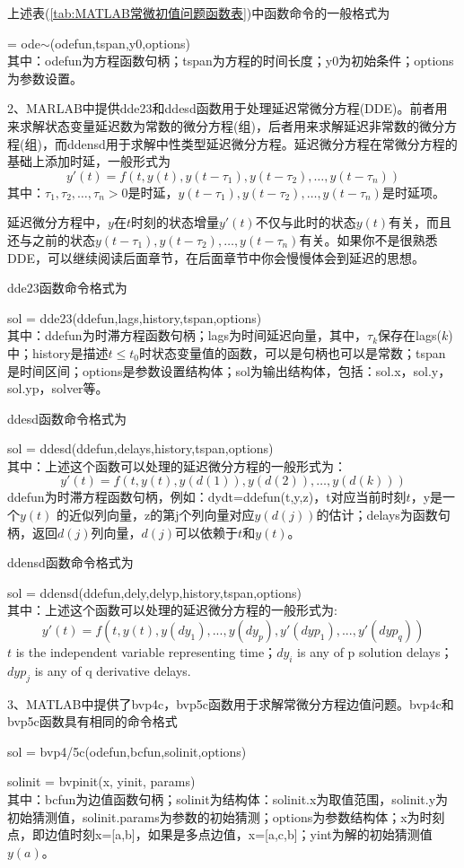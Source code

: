 			\par
			上述表(\ref{tab:MATLAB常微初值问题函数表})中函数命令的一般格式为
			\par
			[t,y] = ode$\sim$(odefun,tspan,y0,options)\\
			其中：odefun为方程函数句柄；tspan为方程的时间长度；y0为初始条件；options为参数设置。
			\par
			2、MARLAB中提供dde23和ddesd函数用于处理延迟常微分方程(DDE)。前者用来求解状态变量延迟数为常数的微分方程(组)，后者用来求解延迟非常数的微分方程(组)，而ddensd用于求解中性类型延迟微分方程。延迟微分方程在常微分方程的基础上添加时延，一般形式为
			\[
				y'(t)=f(t,y(t),y(t-\tau_1),y(t-\tau_2),\dots,y(t-\tau_n))
			\]
			其中：$\tau_1,\tau_2,\dots,\tau_n>0$是时延，$y(t-\tau_1),y(t-\tau_2),\dots,y(t-\tau_n)$是时延项。
			\par
			延迟微分方程中，$y$在$t$时刻的状态增量$y'(t)$不仅与此时的状态$y(t)$有关，而且还与之前的状态$y(t-\tau_1),y(t-\tau_2),\dots,y(t-\tau_n)$有关。如果你不是很熟悉DDE，可以继续阅读后面章节，在后面章节中你会慢慢体会到延迟的思想。
			\par
			dde23函数命令格式为
			\par
			sol = dde23(ddefun,lags,history,tspan,options)\\
			其中：ddefun为时滞方程函数句柄；lags为时间延迟向量，其中，$\tau_k$保存在lags($k$)中；history是描述$t\leq t_0$时状态变量值的函数，可以是句柄也可以是常数；tspan 是时间区间；options是参数设置结构体；sol为输出结构体，包括：sol.x，sol.y，sol.yp，solver等。
			\par
			ddesd函数命令格式为
			\par
			sol = ddesd(ddefun,delays,history,tspan,options)\\
			其中：上述这个函数可以处理的延迟微分方程的一般形式为：
			\[y'(t)=f(t,y(t),y(d(1)),y(d(2)),\dots, y(d(k)))\]ddefun为时滞方程函数句柄，例如：dydt=ddefun(t,y,z)，t对应当前时刻$t$，y是一个$y(t)$ 的近似列向量，z的第j个列向量对应$y(d(j))$的估计；delays为函数句柄，返回$d(j)$列向量，$d(j)$可以依赖于$t$和$y(t)$。
			\par
			ddensd函数命令格式为
			\par
			sol = ddensd(ddefun,dely,delyp,history,tspan,options)\\
			其中：上述这个函数可以处理的延迟微分方程的一般形式为:
			\[y '(t) = f(t, y(t), y(dy_1),..., y(dy_p), y '(dyp_1),..., y '(dyp_q))\]
			$t$ is the independent variable representing time；$dy_i$ is any of p solution delays；$dyp_j$ is any of q derivative delays.
			\par
			3、MATLAB中提供了bvp4c，bvp5c函数用于求解常微分方程边值问题。bvp4c和bvp5c函数具有相同的命令格式
			\par
			sol = bvp4/5c(odefun,bcfun,solinit,options)
			\par
			solinit = bvpinit(x, yinit, params)\\
			其中：bcfun为边值函数句柄；solinit为结构体：solinit.x为取值范围，solinit.y为初始猜测值，solinit.params为参数的初始猜测；options为参数结构体；x为时刻点，即边值时刻x=[a,b]，如果是多点边值，x=[a,c,b]；yint为解的初始猜测值$y(a)$。

